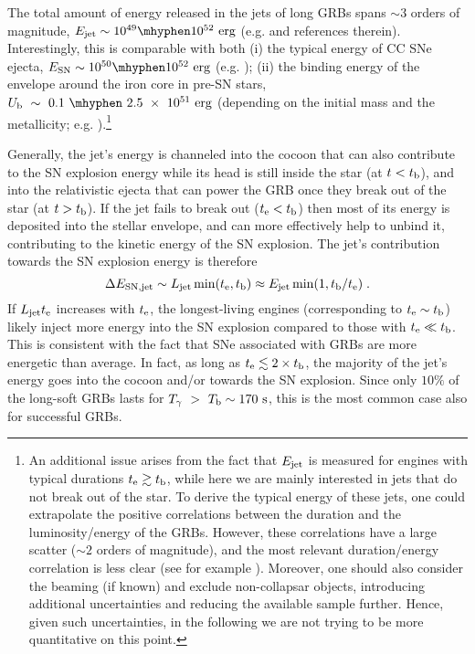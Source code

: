 \documentclass[useAMS,usenatbib]{mn2e}
\begin{document}
The total amount of energy released in the jets of long GRBs spans $\sim 3$ orders of magnitude, $E_{\rm jet}\sim 10^{49}\mhyphen10^{52}\text{ erg}$ (e.g. \citealt{KumarZhang2015} and references therein). Interestingly, this is comparable with both (i) the typical energy of CC SNe ejecta, $E_{\rm SN}\sim 10^{50}\mhyphen10^{52}\text{ erg}$ (e.g. \citealt{Burrows2013}); (ii) the binding energy of the envelope around the iron core in pre-SN stars, $U_{\rm b}~\sim~0.1~\mhyphen~2.5~\times~10^{51}\text{ erg}$ (depending on the initial mass and the metallicity; e.g. \citealt{Woosley2002}).\footnote{An additional issue arises from the fact that $E_{\rm jet}$ is measured for engines with typical durations $t_{\rm e}\gtrsim t_{\rm b}$, while here we are mainly interested in jets that do not break out of the star.
To derive the typical energy of these jets, one could extrapolate the positive correlations between the duration and the luminosity/energy of the GRBs. However, these correlations have a large scatter ($\sim 2$ orders of magnitude), and the most relevant duration/energy correlation is less clear (see for example \citealt{Hou2013}). Moreover, one should also consider the beaming (if known) and exclude non-collapsar objects, introducing additional uncertainties and reducing the available sample further. Hence, given such uncertainties, in the following we are not trying to be more quantitative on this point.}

Generally, the jet's energy is channeled into the cocoon that can also contribute to the SN explosion energy while its head is still inside the star (at $t<t_{\rm b}$), and into the relativistic ejecta that can power the GRB once they break out of the star (at $t>t_{\rm b}$).
If the jet fails to break out ($t_{\rm e}<t_{\rm b}$) then most of its energy is deposited into the stellar envelope, and can more effectively help to unbind it, contributing to the kinetic energy of the SN explosion.
The jet's contribution towards the SN explosion energy is therefore
\begin{equation}
\label{eq:deltaE}
\Delta E_{\rm SN,jet}\sim L_{\rm jet}\min(t_{\rm e},t_{\rm b}) \approx E_{\rm jet}\min(1,t_{\rm b}/t_{\rm e})\;.
\end{equation}
If $L_{\rm jet}t_{\rm e}$ increases with $t_{\rm e}$, the longest-living engines (corresponding to $t_{\rm e}\sim t_{\rm b}$) likely inject more energy into the SN explosion compared to those with $t_{\rm e}\ll t_{\rm b}$. This is consistent with the fact that SNe associated with GRBs are more energetic than average. In fact, as long as $t_{\rm e}\lesssim 2\times t_{\rm b}$, the majority of the jet's energy goes into the cocoon and/or towards the SN explosion. Since only $10\%$ of the long-soft GRBs lasts for $T_\gamma~>~T_{\rm b}\sim 170\text{ s}$, this is the most common case also for successful GRBs.
\end{document}

